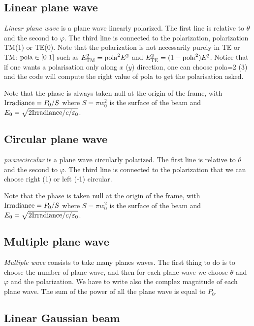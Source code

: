 \subsection{Linear plane wave }

{\it Linear plane wave} is a plane wave linearly polarized. The first
line is relative to $\theta$ and the second to $\varphi$. The third
line is connected to the polarization, polarization TM(1) or TE(0).
Note that the polarization is not necessarily purely in TE or TM:
${\rm pola}\in[0~1]$ such as $E^2_{\rm TM}={\rm pola}^2E^2$ and
$E^2_{\rm TE}=(1-{\rm pola}^2)E^2$. Notice that if one wants a
polarisation only along $x$ ($y$) direction, one can choose pola=2 (3)
and the code will compute the right value of pola to get the
polarisation asked.

Note that the phase is always taken null at the origin of the frame,
with ${\rm Irradiance}=P_0/S$ where $S=\pi w_0^2$ is the surface of
the beam and $E_0=\sqrt{2 {\rm Irradiance}/c/\varepsilon_0}$.


\subsection{Circular plane wave }

{\it pwavecircular } is a plane wave circularly polarized. The first
line is relative to $\theta$ and the second to $\varphi$. The third
line is connected to the polarization that we can choose right (1) or
left (-1) circular.

Note that the phase is taken null at the origin of the frame, with
${\rm Irradiance}=P_0/S$ where $S=\pi w_0^2$ is the surface of the
beam and $E_0=\sqrt{2 {\rm Irradiance}/c/\varepsilon_0}$.


\subsection{Multiple plane wave}

{\it Multiple wave} consists to take many planes waves. The first
thing to do is to choose the number of plane wave, and then for each
plane wave we choose $\theta$ and $\varphi$ and the polarization. We
have to write also the complex magnitude of each plane wave. The sum
of the power of all the plane wave is equal to $P_0$.


\subsection{Linear Gaussian beam}


